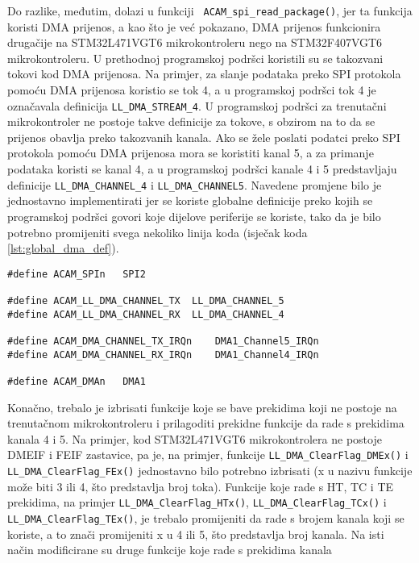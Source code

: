 Do razlike, međutim, dolazi u funkciji \verb| ACAM_spi_read_package()|, jer ta funkcija koristi DMA prijenos, a kao što je već pokazano, DMA prijenos funkcionira drugačije na STM32L471VGT6 mikrokontroleru nego na STM32F407VGT6 mikrokontroleru. U prethodnoj programskoj podršci koristili su se takozvani tokovi kod DMA prijenosa. Na primjer, za slanje podataka preko SPI protokola pomoću DMA prijenosa koristio se tok 4, a u programskoj podršci tok 4 je označavala definicija \verb|LL_DMA_STREAM_4|. U programskoj podršci za trenutačni mikrokontroler ne postoje takve definicije za tokove, s obzirom na to da se prijenos obavlja preko takozvanih kanala. Ako se žele poslati podatci preko SPI protokola pomoću DMA prijenosa mora se koristiti kanal 5, a za primanje podataka koristi se kanal 4, a u programskoj podršci kanale 4 i 5 predstavljaju definicije \verb|LL_DMA_CHANNEL_4| i \verb|LL_DMA_CHANNEL5|. Navedene promjene bilo je jednostavno implementirati jer se koriste globalne definicije preko kojih se programskoj podršci govori koje dijelove periferije se koriste, tako da je bilo potrebno promijeniti svega nekoliko linija koda (isječak koda \ref{lst:global_dma_def}).
\begin{lstlisting}[caption=Zaglavlje \texttt{dma.h} datoteke u kojima se definira koji dijelovi periferija se koriste, label={lst:global_dma_def}]
#define ACAM_SPIn	SPI2

#define ACAM_LL_DMA_CHANNEL_TX	LL_DMA_CHANNEL_5
#define ACAM_LL_DMA_CHANNEL_RX	LL_DMA_CHANNEL_4

#define ACAM_DMA_CHANNEL_TX_IRQn	DMA1_Channel5_IRQn
#define ACAM_DMA_CHANNEL_RX_IRQn	DMA1_Channel4_IRQn

#define ACAM_DMAn	DMA1
\end{lstlisting}

Konačno, trebalo je izbrisati funkcije koje se bave prekidima koji ne postoje na trenutačnom mikrokontroleru i prilagoditi prekidne funkcije da rade s prekidima kanala 4 i 5. Na primjer, kod STM32L471VGT6 mikrokontrolera ne postoje DMEIF i FEIF zastavice, pa je, na primjer, funkcije \verb|LL_DMA_ClearFlag_DMEx()| i \\ \verb|LL_DMA_ClearFlag_FEx()| jednostavno bilo potrebno izbrisati (x u nazivu funkcije može biti 3 ili 4, što predstavlja broj toka). Funkcije koje rade s HT, TC i TE prekidima, na primjer \verb|LL_DMA_ClearFlag_HTx()|, \verb|LL_DMA_ClearFlag_TCx()| i \\ \verb|LL_DMA_ClearFlag_TEx()|, je trebalo promijeniti da rade s brojem kanala koji se koriste, a to znači promijeniti x u 4 ili 5, što predstavlja broj kanala. Na isti način modificirane su druge funkcije koje rade s prekidima kanala

